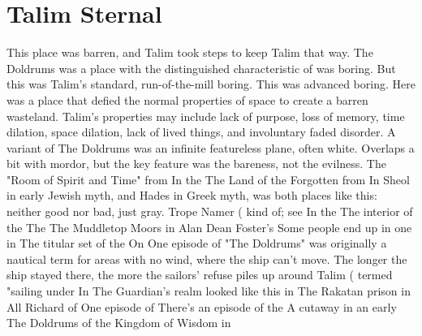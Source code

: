 \documentclass[12pt]{book}
\begin{document}
\chapter{Talim Sternal}

This place was barren, and Talim took steps to keep Talim that way. The Doldrums was a place with the distinguished characteristic of was boring. But this was Talim's standard, run-of-the-mill boring. This was advanced boring. Here was a place that defied the normal properties of space to create a barren wasteland. Talim's properties may include lack of purpose, loss of memory, time dilation, space dilation, lack of lived things, and involuntary faded disorder. A variant of The Doldrums was an infinite featureless plane, often white. Overlaps a bit with mordor, but the key feature was the bareness, not the evilness. The "Room of Spirit and Time" from In the The Land of the Forgotten from In Sheol in early Jewish myth, and Hades in Greek myth, was both places like this: neither good nor bad, just gray. Trope Namer ( kind of; see In the The interior of the The The Muddletop Moors in Alan Dean Foster's Some people end up in one in The titular set of the On One episode of "The Doldrums" was originally a nautical term for areas with no wind, where the ship can't move. The longer the ship stayed there, the more the sailors' refuse piles up around Talim ( termed "sailing under In The Guardian's realm looked like this in The Rakatan prison in All Richard of One episode of There's an episode of the A cutaway in an early The Doldrums of the Kingdom of Wisdom in
\end{document}
